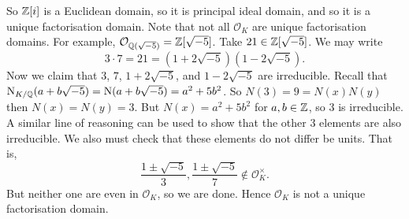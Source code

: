 So $\mathbb{Z}[i]$ is a Euclidean domain, so it is principal ideal domain, and so 
it is a unique factorisation domain.
Note that not all $\mathcal O_K$ are unique factorisation domains.
For example, $\mathcal O_{\mathbb{Q}(\sqrt{-5})} = \mathbb{Z}[\sqrt{-5}]$.
Take $21 \in \mathbb{Z}[\sqrt{-5}]$.
We may write
\[
	3 \cdot 7 = 21 = (1 + 2\sqrt{-5})(1 - 2\sqrt{-5}).
\]
Now we claim that $3$, $7$, $1 + 2\sqrt{-5}$, and $1 - 2\sqrt{-5}$ are
irreducible.
Recall that $
	\operatorname{N}_{K/\mathbb{Q}}(a + b\sqrt{-5}) 
	= \operatorname{N}(a + b\sqrt{-5})
	= a^2 + 5b^2
$.
So $N(3) = 9 = N(x) N(y)$ then $N(x) = N(y) = 3$.
But $N(x) = a^2 + 5b^2$ for $a, b \in \mathbb{Z}$, so $3$ is irreducible.
A similar line of reasoning can be used to show that the other 3 elements
are also irreducible.
We also must check that these elements do not differ be units.
That is,
\[
	\frac{1 \pm \sqrt{-5}}{3}, \frac{1 \pm \sqrt{-5}}{7} 
	\not\in \mathcal O_K^\times.
\]
But neither one are even in $\mathcal O_K$, so we are done.
Hence $\mathcal O_K$ is not a unique factorisation domain.
